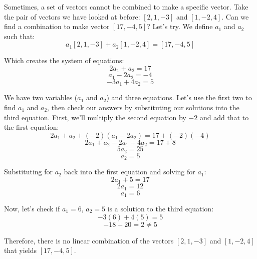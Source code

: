 Sometimes, a set of vectors cannot be combined to make a specific vector. Take 
the pair of vectors we have looked at before: $\left[ 2, 1, -3 \right]$ and 
$\left[ 1, -2, 4 \right]$. Can we find a combination to make vector $\left[ 
17, -4, 5 \right]$? Let's try. We define $a_1$ and $a_2$ such that:
$$a_1 \left[ 2, 1, -3 \right] + a_2 \left[ 1, -2, 4 \right] = \left[ 17, -4, 5 
\right]$$

Which creates the system of equations:
$$2 a_1 + a_2 = 17$$
$$a_1 - 2 a_2 = -4$$
$$-3 a_1 + 4 a_2 = 5$$

We have two variables ($a_1$ and $a_2$) and three equations. Let's use the 
first two to find $a_1$ and $a_2$, then check our answers by substituting our 
solutions into the third equation. First, we'll multiply the second equation 
by $-2$ and add that to the first equation:
$$2 a_1 + a_2 + \left( -2 \right) \left( a_1 - 2 a_2 \right) = 17 + \left( -2 
\right) \left( -4 \right)$$
$$2 a_1 + a_2 - 2 a_1 + 4 a_2 = 17 + 8$$
$$5 a_2 = 25$$
$$a_2 = 5$$

Substituting for $a_2$ back into the first equation and solving for $a_1$:
$$2 a_1 + 5 = 17$$
$$2 a_1 = 12$$
$$a_1 = 6$$

Now, let's check if $a_1 = 6$, $a_2 = 5$ is a solution to the third equation:
$$-3 \left( 6 \right) + 4 \left( 5 \right) = 5$$
$$-18 + 20 = 2 \neq 5$$

Therefore, there is no linear combination of the vectors $\left[ 2, 1, -3 
\right]$ and $\left[ 1, -2, 4 \right]$ that yields $\left[ 17, -4, 5 \right]$.